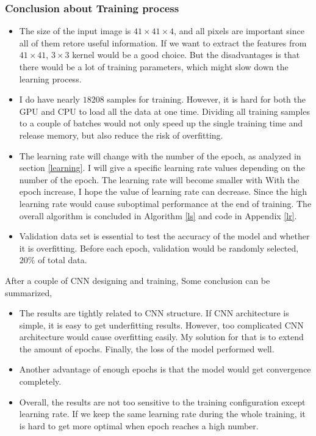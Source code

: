     \subsubsection{Conclusion about Training process}
    \begin{itemize}
        \item The size of the input image is $41\times41\times4$, and all pixels are important since all of them retore useful information. If we want to extract the features from $41\times 41$, $3\times 3$ kernel would be a good choice. But the disadvantages is that there would be a lot of training parameters, which might slow down the learning process.
        \item I do have nearly $18208$ samples for training. However, it is hard for both the GPU and CPU to load all the data at one time. Dividing all training samples to a couple of batches would not only speed up the single training time and release memory, but also reduce the risk of overfitting.
        \item The learning rate will change with the number of the epoch, as analyzed in section \ref{learning}. I will give a specific learning rate values depending on the number of the epoch. The learning rate will become smaller with With the epoch increase, I hope the value of learning rate can decrease. Since the high learning rate would cause suboptimal performance at the end of training. The overall algorithm is concluded in Algorithm \ref{ls} and code in Appendix \ref{lr}.
        \item Validation data set is essential to test the accuracy of the model and whether it is overfitting. Before each epoch, validation would be randomly selected, $20\%$ of total data.
    \end{itemize}

    After a couple of CNN designing and training, Some conclusion can be summarized,
    \begin{itemize}
        \item The results are tightly related to CNN structure. If CNN architecture is simple, it is easy to get underfitting results. However, too complicated CNN architecture would cause overfitting easily. My solution for that is to extend the amount of epochs. Finally, the loss of the model performed well.
        \item Another advantage of enough epochs is that the model would get convergence completely.
        \item Overall, the results are not too sensitive to the training configuration except learning rate. If we keep the same learning rate during the whole training, it is hard to get more optimal when epoch reaches a high number.
    \end{itemize}



